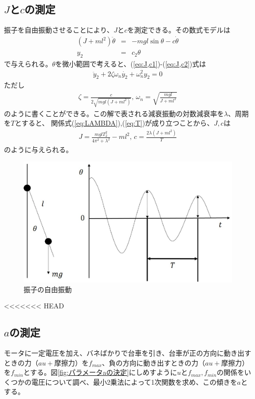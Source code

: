 \documentclass[a4j,11pt,twoside]{ujbook}
\begin{document}
	\subsection{$J$と$c$の測定}
	振子を自由振動させることにより、$J$と$c$を測定できる。その数式モデルは
	\begin{eqnarray}
		(J+ml^2)\ddot{\theta} & = & -mgl\sin{\theta} - c\dot{\theta}
		\label{eq:J,c1}\\
		y_2 & = & c_2\theta
		\label{eq:J,c2}
	\end{eqnarray}
	で与えられる。$\theta$を微小範囲で考えると、(\ref{eq:J,c1})-(\ref{eq:J,c2})式は
	\begin{eqnarray*}
		\ddot{y}_2 + 2\zeta\omega_n\dot{y_2} + \omega_n^2y_2 = 0
	\end{eqnarray*}
	ただし
	\begin{eqnarray*}
		\zeta = \frac{c}{2\sqrt{mgl(J + ml^2)}},\,
		\omega_n = \sqrt{\frac{mgl}{J + ml^2}}
	\end{eqnarray*}
	のように書くことができる。この解で表される減衰振動の対数減衰率を$\lambda$、周期を$T$とすると、
	関係式(\ref{eq:LAMBDA}),(\ref{eq:T})が成り立つことから、$J,c$は
	\begin{eqnarray}
		J = \frac{mglT_2^2}{4\pi^2 + \lambda^2} - ml^2 ,\, c = \frac{2\lambda(J +
		ml^2)}{T}
	\end{eqnarray}
	のように与えられる。

	\begin{figure}[htbp]
		\begin{center}
			\includegraphics[width = 0.7 \linewidth]{freePend.eps}
			\caption{振子の自由振動}
			\label{fig:振子の自由振動}
		\end{center}
	\end{figure}

<<<<<<< HEAD
\subsection{$a$の測定}
モータに一定電圧を加え、バネばかりで台車を引き、台車が正の方向に動き出すときの力（$au+摩擦力$）を$f_{max}$、負の方向に動き出すときの力（$au+摩擦力$）を$f_{min}$とする。図\ref{fig:パラメータaの決定}にしめすように$u$と$f_{max},f_{min}$の関係をいくつかの電圧について調べ、最小2乗法によって1次関数を求め、この傾きを$a$とする。
\end{document}
